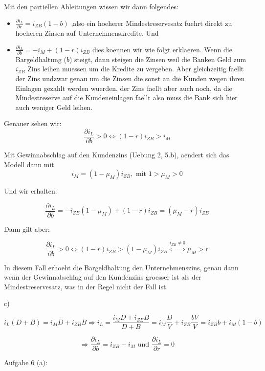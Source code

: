 \documentclass[a4paper]{article}
\begin{document}
Mit den partiellen Ableitungen wissen wir dann folgendes:

\begin{itemize}
	\item $\frac{ \partial i_L }{ \partial r } = i_{ZB} (1 - b)$
	      ,also ein hoeherer Mindestreservesatz fuehrt direkt
	      zu hoeheren Zinsen auf Unternehmenskredite. Und

	\item $\frac{ \partial i_L }{ \partial b } = -i_M + (1 - r) i_{ZB}$
	      dies koennen wir wie folgt erklaeren. Wenn die Bargeldhaltung ($b$)
	      steigt, dann steigen die Zinsen weil die Banken Geld zum $i_{ZB}$
	      Zins leihen muessen um die Kredite zu vergeben. Aber gleichzeitig
	      faellt der Zins undzwar genau um die Zinsen die sonst an die Kunden
	      wegen ihren Einlagen gezahlt werden wuerden, der Zins faellt aber auch
	      noch, da die Mindestreserve auf die Kundeneinlagen faellt also muss die
	      Bank sich hier auch weniger Geld leihen.
\end{itemize}

Genauer sehen wir:
\[
	\frac{ \partial i_L }{ \partial b } > 0 \Leftrightarrow
	(1 - r) i_{ZB} > i_M
\]

Mit Gewinnabschlag auf den Kundenzins (Uebung 2, 5.b),
aendert sich das Modell dann mit
\[
	i_M = (1 - \mu_M) i_{ZB}, \text{ mit } 1 > \mu_M > 0
\]

Und wir erhalten:

\[
	\frac{ \partial i_L }{ \partial b } =
	- i_{ZB} (1 - \mu_M) + (1 - r) i_{ZB} =
	(\mu_M - r) i_{ZB}
\]

Dann gilt aber:

\[
	\frac{ \partial i_L }{ \partial b } > 0 \Leftrightarrow
	(1 - r) i_{ZB} > (1 - \mu_M) i_{ZB} \overset{i_{ZB} \neq 0} \Leftrightarrow
	\mu_M > r
\]

In diesem Fall erhoeht die Bargeldhaltung den Unternehmenszins, genau dann wenn
der Gewinnabschlag auf den Kundenzins groesser ist als der Mindestreservesatz,
was in der Regel nicht der Fall ist.

c)

\[
	i_L \left(
	D + B
	\right) =
	i_M D + i_{ZB} B \Rightarrow
	i_L = \frac{ i_M D + i_{ZB} B }{ D + B } =
	i_M \frac{ D }{ V } + i_{ZB} \frac{ bV }{ V } =
	i_{ZB} b + i_M (1 - b)
\]

\[
	\Rightarrow \frac{ \partial i_L }{ \partial b } =
	i_{ZB} - i_M \text{ und }
	\frac{ \partial i_L }{ \partial r } = 0
\]

Aufgabe 6 (a):
\end{document}
